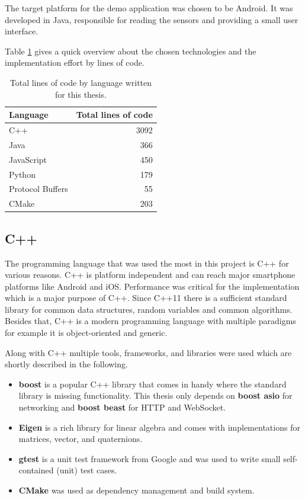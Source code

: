 The target platform for the demo application was chosen to be Android. It was developed in Java, responsible for reading the sensors and providing a small user interface.

Table \ref{tbl:code_lines} gives a quick overview about the chosen technologies and the implementation effort by lines of code.

\begin{table}[h]
    \centering
    \begin{tabular}{ | l | r | }
    \hline
    \textbf{Language} & \textbf{Total lines of code} \\ \hline
    C++               & 3092 \\ \hline
    Java              &  366 \\ \hline
    JavaScript        &  450 \\ \hline
    Python            &  179 \\ \hline
    Protocol Buffers  &   55 \\ \hline
    CMake             &  203 \\ \hline
    \end{tabular}
    \caption{Total lines of code by language written for this thesis.}
    \label{tbl:code_lines}
\end{table}

\subsection{C++}

The programming language that was used the most in this project is C++ for various reasons. C++ is platform independent and can reach major smartphone platforms like Android and iOS. Performance was critical for the implementation which is a major purpose of C++. Since C++11 there is a sufficient standard library for common data structures, random variables and common algorithms. Besides that, C++ is a modern programming language with multiple paradigms for example it is object-oriented and generic.

Along with C++ multiple tools, frameworks, and libraries were used which are shortly described in the following.

\begin{itemize}
  \item \textbf{boost} is a popular C++ library that comes in handy where the standard library is missing functionality. This thesis only depends on \textbf{boost asio} for networking and \textbf{boost beast} for HTTP and WebSocket.
  \item \textbf{Eigen} is a rich library for linear algebra and comes with implementations for matrices, vector, and quaternions.
  \item \textbf{gtest} is a unit test framework from Google and was used to write small self-contained (unit) test cases.
  \item \textbf{CMake} was used as dependency management and build system.
\end{itemize}

